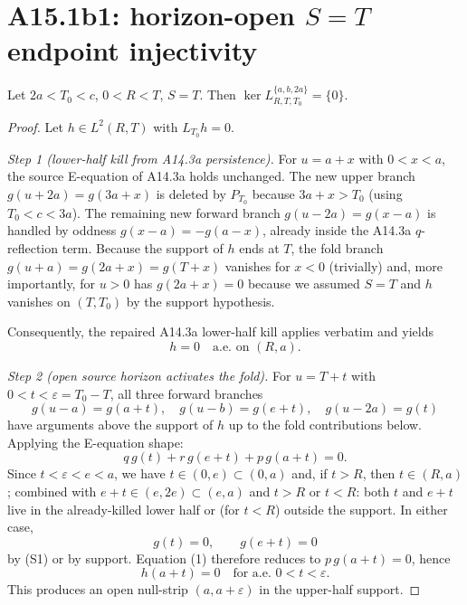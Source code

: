 \section{A15.1b1: horizon-open \texorpdfstring{$S = T$}{S=T} endpoint injectivity}
\label{sec:p12-b1}

\begin{theorem}\label{thm:p12-b1}
Let $2a < T_0 < c$, $0 < R < T$, $S = T$.  Then
\(\ker L_{R,T,T_0}^{\{a,b,2a\}} = \{0\}\).
\end{theorem}

\begin{proof}
Let $h \in L^2(R, T)$ with $L_{T_0} h = 0$.

\medskip
\noindent\emph{Step 1 (lower-half kill from A14.3a persistence).}
For $u = a + x$ with $0 < x < a$, the source E-equation of A14.3a
holds unchanged.  The new upper branch $g(u + 2a) = g(3a + x)$ is
deleted by $P_{T_0}$ because $3a + x > T_0$ (using $T_0 < c < 3a$).
The remaining new forward branch $g(u - 2a) = g(x - a)$ is handled by
oddness $g(x - a) = -g(a - x)$, already inside the A14.3a $q$-reflection
term.  Because the support of $h$ ends at $T$, the fold branch
$g(u + a) = g(2a + x) = g(T + x)$ vanishes for $x < 0$ (trivially) and,
more importantly, for $u > 0$ has $g(2a + x) = 0$ because we assumed
$S = T$ and $h$ vanishes on $(T, T_0)$ by the support hypothesis.

Consequently, the repaired A14.3a lower-half kill applies verbatim and
yields
\[
h = 0 \quad \text{a.e. on } (R, a).
\tag{S1}
\]

\medskip
\noindent\emph{Step 2 (open source horizon activates the fold).}
For $u = T + t$ with $0 < t < \varepsilon = T_0 - T$, all three forward
branches
\[
g(u - a) = g(a + t),\quad
g(u - b) = g(e + t),\quad
g(u - 2a) = g(t)
\]
have arguments above the support of $h$ up to the fold contributions
below.  Applying the E-equation shape:
\[
q\,g(t) + r\,g(e + t) + p\,g(a + t) = 0.
\tag{1}
\]
Since $t < \varepsilon < e < a$, we have $t \in (0, e) \subset (0, a)$
and, if $t > R$, then $t \in (R, a)$; combined with $e + t \in (e, 2e)
\subset (e, a)$ and $t > R$ or $t < R$: both $t$ and $e + t$ live in the
already-killed lower half or (for $t < R$) outside the support.  In
either case,
\[
g(t) = 0, \qquad g(e + t) = 0
\]
by (S1) or by support.  Equation (1) therefore reduces to
$p\, g(a + t) = 0$, hence
\[
h(a + t) = 0 \quad\text{for a.e. } 0 < t < \varepsilon.
\tag{S2}
\]
This produces an open null-strip $(a, a + \varepsilon)$ in the
upper-half support.


\end{proof}

